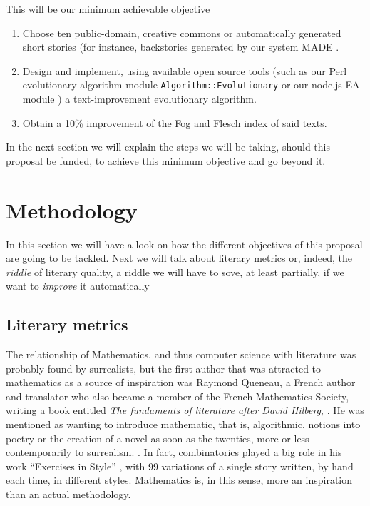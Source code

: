 \documentclass[a4paper,12pt,twocolumn]{article}
\begin{document}
This will be our minimum achievable objective\begin{enumerate}
\item Choose ten public-domain, creative commons or automatically
  generated short stories (for instance, backstories generated by our
  system MADE \cite{2014arXiv1403.3084G}.
\item Design and implement, using available open source tools (such as our Perl
  evolutionary algorithm module {\tt Algorithm::Evolutionary}
  \cite{ae09} or our node.js EA module \cite{nodeo2014}) a
  text-improvement evolutionary algorithm. 
\item Obtain a 10\% improvement of the Fog and Flesch index of said
  texts.
\end{enumerate}

In the next section we will explain the steps we will be taking,
should this proposal be funded, to
achieve this minimum objective and go beyond it. 

\section{Methodology}
\label{sec:meth}

In this section we will have a look on how the different objectives of
this proposal are going to be tackled. Next we will talk about
literary metrics or, indeed, the {\em riddle} of literary quality, a
riddle we will have to sove, at least partially, if we want to {\em
  improve} it automatically

\subsection{Literary metrics}

The relationship of Mathematics, and thus computer science with
literature was probably found by surrealists, but the first author
that was attracted to mathematics as a source of inspiration was
Raymond Queneau, a French author and translator who also became a
member of the French Mathematics Society, writing a book entitled {\em
  The fundaments of literature after David Hilberg},
\cite{queneau1976fondements}. He was mentioned as wanting to introduce
mathematic, that is, algorithmic, notions into poetry or the creation
of a novel as soon as the twenties, more or less contemporarily to
surrealism. \cite{emmer2005mathematics}. In fact, combinatorics played
a big role in his work ``Exercises in Style''
\cite{queneau2013exercises}, with 99 variations of a single story
written, by hand each time, in different styles. Mathematics is, in
this sense, more an inspiration than an actual methodology. 
\end{document}
